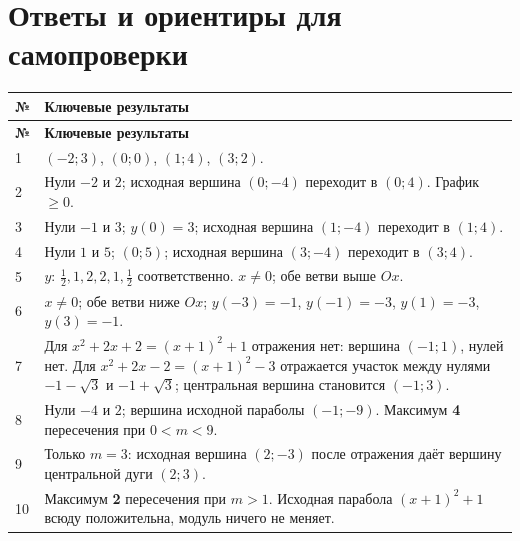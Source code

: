 \documentclass[a4paper,12pt]{article}
\newcommand{\accentsection}[1]{\section*{\color{darkaccent}#1}}
\begin{document}
\clearpage
\accentsection{Ответы и ориентиры для самопроверки}
\small
\setlength{\LTpre}{4pt}\setlength{\LTpost}{4pt}
\renewcommand{\arraystretch}{1.27}
\begin{longtable}{@{}p{8mm}p{\dimexpr\linewidth-14mm\relax}@{}}
\toprule
\textbf{№} & \textbf{Ключевые результаты}\\
\midrule
\endfirsthead
\toprule
\textbf{№} & \textbf{Ключевые результаты}\\
\midrule
\endhead
1 & $(-2;3)$, $(0;0)$, $(1;4)$, $(3;2)$.\\
2 & Нули $-2$ и $2$; исходная вершина $(0;-4)$ переходит в $(0;4)$. График $\ge0$.\\
3 & Нули $-1$ и $3$; $y(0)=3$; исходная вершина $(1;-4)$ переходит в $(1;4)$.\\
4 & Нули $1$ и $5$; $(0;5)$; исходная вершина $(3;-4)$ переходит в $(3;4)$.\\
5 & $y$: $\frac12,1,2,2,1,\frac12$ соответственно. $x\ne0$; обе ветви выше $Ox$.\\
6 & $x\ne0$; обе ветви ниже $Ox$; $y(-3)=-1$, $y(-1)=-3$, $y(1)=-3$, $y(3)=-1$.\\
7 & Для $x^2+2x+2=(x+1)^2+1$ отражения нет: вершина $(-1;1)$, нулей нет. Для $x^2+2x-2=(x+1)^2-3$ отражается участок между нулями $-1-\sqrt3$ и $-1+\sqrt3$; центральная вершина становится $(-1;3)$.\\
8 & Нули $-4$ и $2$; вершина исходной параболы $(-1;-9)$. Максимум \textbf{4} пересечения при $0<m<9$.\\
9 & Только $m=3$: исходная вершина $(2;-3)$ после отражения даёт вершину центральной дуги $(2;3)$.\\
10 & Максимум \textbf{2} пересечения при $m>1$. Исходная парабола $(x+1)^2+1$ всюду положительна, модуль ничего не меняет.\\
\bottomrule
\end{longtable}
\normalsize
\end{document}
